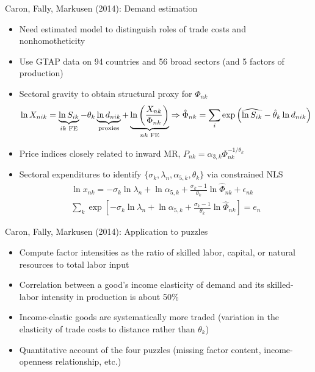 \documentclass[11pt,notes=hide,aspectratio=169]{beamer}
\begin{document}
\begin{frame}{Caron, Fally, Markusen (2014): Demand estimation}
\linespread{1.0}
\begin{itemize}
	\item Need estimated model to distinguish roles of trade costs and nonhomotheticity
	\item Use GTAP data on 94 countries and 56 broad sectors (and 5 factors of production)
	\item Sectoral gravity to obtain structural proxy for $\Phi_{nk}$
	\begin{equation*}
	\ln X_{nik} = \underbrace{\ln S_{ik}}_{ik \textnormal{ FE}} - \theta_k \underbrace{\ln d_{nik}}_{\textnormal{proxies}} + \underbrace{\ln\left(\frac{X_{nk}}{\Phi_{nk}} \right)}_{nk \textnormal{ FE}}
	\Rightarrow
	\hat{\Phi}_{nk} = \sum_i \exp \left( \widehat{\ln S_{ik}} - \hat{\theta}_k \ln d_{nik} \right)
	\end{equation*}
	\item Price indices closely related to inward MR, $P_{nk} = \alpha_{3,k} \Phi_{nk}^{-1/\theta_k}$
	\item Sectoral expenditures to identify $\{\sigma_k, \lambda_n, \alpha_{5,k}, \theta_k\}$ via constrained NLS
	\begin{align*}
	\ln x_{nk} = {-\sigma_k}\ln \lambda_n + \ln \alpha_{5,k} + \frac{\sigma_k-1}{\theta_k} \ln \hat{\Phi}_{nk} + \epsilon_{nk} \\
	\sum_k \exp \left[ {-\sigma_k}\ln \lambda_n + \ln \alpha_{5,k} + \frac{\sigma_k-1}{\theta_k} \ln \hat{\Phi}_{nk} \right] = e_n
	\end{align*}
\end{itemize}
\end{frame}
\begin{frame}{Caron, Fally, Markusen (2014): Application to puzzles}
\begin{itemize}
	\item Compute factor intensities as the ratio of skilled labor, capital, or natural resources to total labor input
	\item Correlation between a good's income elasticity of demand and its skilled-labor intensity in production is about 50\%
	\item Income-elastic goods are systematically more traded (variation in the elasticity of trade costs to distance rather than $\theta_k$)
	\item Quantitative account of the four puzzles (missing factor content, income-openness relationship, etc.)
\end{itemize}
\end{frame}
\end{document}
